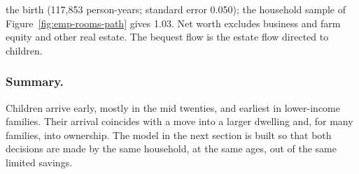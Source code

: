 \begin{table}[t]
\begin{minipage}{0.95\linewidth}
the birth (117,853 person-years; standard error 0.050); the household sample
of Figure~\ref{fig:emp-rooms-path} gives 1.03. Net worth excludes business and
farm equity and other real estate. The bequest flow is the estate flow
directed to children.
\end{minipage}
\end{table}

\subsubsection*{Summary.}
Children arrive early, mostly in the mid twenties, and earliest in
lower-income families. Their arrival coincides with a move into a larger
dwelling and, for many families, into ownership. The model in the next
section is built so that both decisions are made by the same household, at the
same ages, out of the same limited savings.

